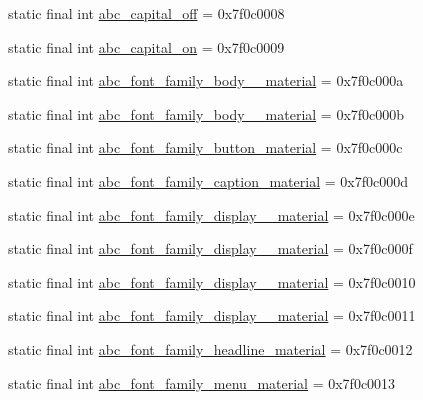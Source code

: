 \begin{DoxyCompactItemize}
static final int \mbox{\hyperlink{classandroid_1_1support_1_1design_1_1R_1_1string_ad46592fba1fea78b0e19f3518fb6f4e2}{abc\+\_\+capital\+\_\+off}} = 0x7f0c0008
\item 
static final int \mbox{\hyperlink{classandroid_1_1support_1_1design_1_1R_1_1string_a30323ab4c5b6d961b3b1befd438dc709}{abc\+\_\+capital\+\_\+on}} = 0x7f0c0009
\item 
static final int \mbox{\hyperlink{classandroid_1_1support_1_1design_1_1R_1_1string_a106039ca637d01d0b52a7e9f5e1d279e}{abc\+\_\+font\+\_\+family\+\_\+body\+\_\+\_\+material}} = 0x7f0c000a
\item 
static final int \mbox{\hyperlink{classandroid_1_1support_1_1design_1_1R_1_1string_a6a320c8254930193f6f5b4cca0884be9}{abc\+\_\+font\+\_\+family\+\_\+body\+\_\+\_\+material}} = 0x7f0c000b
\item 
static final int \mbox{\hyperlink{classandroid_1_1support_1_1design_1_1R_1_1string_a6fc5045e2023471f6c7a464f3b7cf4fb}{abc\+\_\+font\+\_\+family\+\_\+button\+\_\+material}} = 0x7f0c000c
\item 
static final int \mbox{\hyperlink{classandroid_1_1support_1_1design_1_1R_1_1string_af36391cb3353b503b81fb1fe1bc19dab}{abc\+\_\+font\+\_\+family\+\_\+caption\+\_\+material}} = 0x7f0c000d
\item 
static final int \mbox{\hyperlink{classandroid_1_1support_1_1design_1_1R_1_1string_af9f636ee17ea29f83a82be8362651271}{abc\+\_\+font\+\_\+family\+\_\+display\+\_\+\_\+material}} = 0x7f0c000e
\item 
static final int \mbox{\hyperlink{classandroid_1_1support_1_1design_1_1R_1_1string_a413e8fb711210f85e1b8964ab697c716}{abc\+\_\+font\+\_\+family\+\_\+display\+\_\+\_\+material}} = 0x7f0c000f
\item 
static final int \mbox{\hyperlink{classandroid_1_1support_1_1design_1_1R_1_1string_a99a27d2339861258cb4b6bd9026717c6}{abc\+\_\+font\+\_\+family\+\_\+display\+\_\+\_\+material}} = 0x7f0c0010
\item 
static final int \mbox{\hyperlink{classandroid_1_1support_1_1design_1_1R_1_1string_a76f7b5add4d6a8d9813b0ca11766dad5}{abc\+\_\+font\+\_\+family\+\_\+display\+\_\+\_\+material}} = 0x7f0c0011
\item 
static final int \mbox{\hyperlink{classandroid_1_1support_1_1design_1_1R_1_1string_a4f7d547c5ab28f983d3a4937d9dd6367}{abc\+\_\+font\+\_\+family\+\_\+headline\+\_\+material}} = 0x7f0c0012
\item 
static final int \mbox{\hyperlink{classandroid_1_1support_1_1design_1_1R_1_1string_a5456366ce00ccce19f6810ff5d297775}{abc\+\_\+font\+\_\+family\+\_\+menu\+\_\+material}} = 0x7f0c0013

\end{DoxyCompactItemize}
